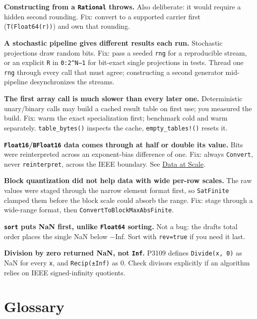 \textbf{Constructing from a \texttt{Rational} throws.} Also deliberate: it would require a hidden second rounding. Fix: convert to a supported carrier first (\texttt{T(Float64(r))}) and own that rounding.



\textbf{A stochastic pipeline gives different results each run.} Stochastic projections draw random bits. Fix: pass a seeded \texttt{rng} for a reproducible stream, or an explicit \texttt{R} in \texttt{0:2{\textasciicircum}N−1} for bit-exact single projections in tests. Thread one \texttt{rng} through every call that must agree; constructing a second generator mid-pipeline desynchronizes the streams.



\textbf{The first array call is much slower than every later one.} Deterministic unary/binary calls may build a cached result table on first use; you measured the build. Fix: warm the exact specialization first; benchmark cold and warm separately. \texttt{table\_bytes()} inspects the cache, \texttt{empty\_tables!()} resets it.



\textbf{\texttt{Float16}/\texttt{BFloat16} data comes through at half or double its value.} Bits were reinterpreted across an exponent-bias difference of one. Fix: always \texttt{Convert}, never \texttt{reinterpret}, across the IEEE boundary. See \href{data.md}{Data at Scale}.



\textbf{Block quantization did not help data with wide per-row scales.} The raw values were staged through the narrow element format first, so \texttt{SatFinite} clamped them before the block scale could absorb the range. Fix: stage through a wide-range format, then \texttt{ConvertToBlockMaxAbsFinite}.



\textbf{\texttt{sort} puts NaN first, unlike \texttt{Float64} sorting.} Not a bug: the draft{\textquotesingle}s total order places the single NaN below −Inf. Sort with \texttt{rev=true} if you need it last.



\textbf{Division by zero returned NaN, not \texttt{Inf}.} P3109 defines \texttt{Divide(x, 0)} as NaN for every \texttt{x}, and \texttt{Recip(±Inf)} as 0. Check divisors explicitly if an algorithm relies on IEEE signed-infinity quotients.



\part{Glossary}


